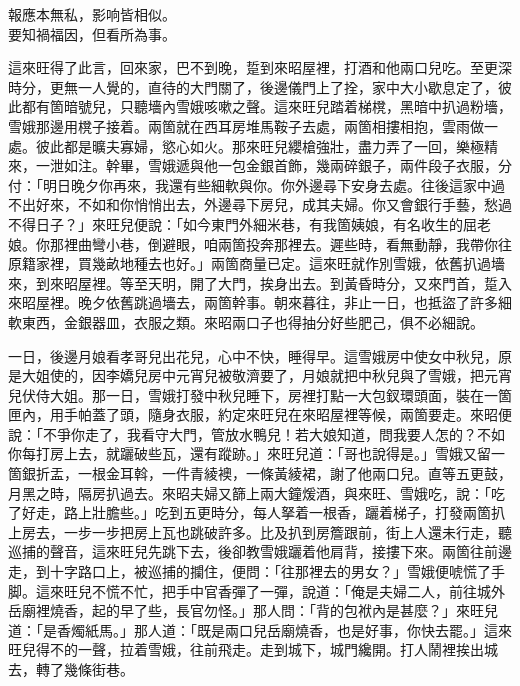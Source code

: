 \begin{myquote}
報應本無私，影响皆相似。\\要知禍福因，但看所為事。
\end{myquote}

這來旺得了此言，回來家，巴不到晚，踅到來昭屋裡，打酒和他兩口兒吃。至更深時分，更無一人覺的，直待的大門關了，後邊儀門上了拴，家中大小歇息定了，彼此都有箇暗號兒，只聽墻內雪娥咳嗽之聲。這來旺兒踏着梯櫈，黑暗中扒過粉墻，雪娥那邊用櫈子接着。兩箇就在西耳房堆馬鞍子去處，兩箇相摟相抱，雲雨做一處。彼此都是曠夫寡婦，慾心如火。那來旺兒纓槍強壯，盡力弄了一回，樂極精來，一泄如注。幹畢，雪娥遞與他一包金銀首飾，幾兩碎銀子，兩件段子衣服，分付：「明日晚夕你再來，我還有些細軟與你。你外邊尋下安身去處。往後這家中過不出好來，不如和你悄悄出去，外邊尋下房兒，成其夫婦。你又會銀行手藝，愁過不得日子？」{}來旺兒便說：「如今東門外細米巷，有我箇姨娘，有名收生的屈老娘。你那裡曲彎小巷，倒避眼，咱兩箇投奔那裡去。遲些時，看無動靜，我帶你往原籍家裡，買幾畝地種去也好。」兩箇商量已定。這來旺就作別雪娥，依舊扒過墻來，到來昭屋裡。等至天明，開了大門，挨身出去。到黃昏時分，又來門首，踅入來昭屋裡。晚夕依舊跳過墻去，兩箇幹事。朝來暮往，非止一日，也抵盜了許多細軟東西，金銀器皿，衣服之類。來昭兩口子也得抽分好些肥己，俱不必細說。

一日，後邊月娘看孝哥兒出花兒，心中不快，睡得早。這雪娥房中使女中秋兒，原是大姐使的，因李嬌兒房中元宵兒被敬濟要了，月娘就把中秋兒與了雪娥，把元宵兒伏侍大姐。那一日，雪娥打發中秋兒睡下，房裡打點一大包釵環頭面，裝在一箇匣內，用手帕蓋了頭，隨身衣服，約定來旺兒在來昭屋裡等候，兩箇要走。來昭便說：「不爭你走了，我看守大門，管放水鴨兒！若大娘知道，問我要人怎的？不如你每打房上去，就躧破些瓦，還有蹤跡。」來旺兒道：「哥也說得是。」雪娥又留一箇銀折盂，一根金耳斡，一件青綾襖，一條黃綾裙，謝了他兩口兒。直等五更鼓，月黑之時，隔房扒過去。來昭夫婦又篩上兩大鐘煖酒，與來旺、雪娥吃，說：「吃了好走，路上壯膽些。」吃到五更時分，每人拏着一根香，躧着梯子，打發兩箇扒上房去，一步一步把房上瓦也跳破許多。比及扒到房簷跟前，街上人還未行走，聽巡捕的聲音，這來旺兒先跳下去，後卻教雪娥躧着他肩背，接摟下來。兩箇往前邊走，到十字路口上，被巡捕的攔住，{}便問：「往那裡去的男女？」雪娥便唬慌了手脚。這來旺兒不慌不忙，把手中官香彈了一彈，說道：「俺是夫婦二人，前往城外岳廟裡燒香，起的早了些，長官勿怪。」那人問：「背的包袱內是甚麼？」來旺兒道：「是香燭紙馬。」那人道：「既是兩口兒岳廟燒香，也是好事，你快去罷。」這來旺兒得不的一聲，拉着雪娥，往前飛走。走到城下，城門纔開。打人鬧裡挨出城去，轉了幾條街巷。

